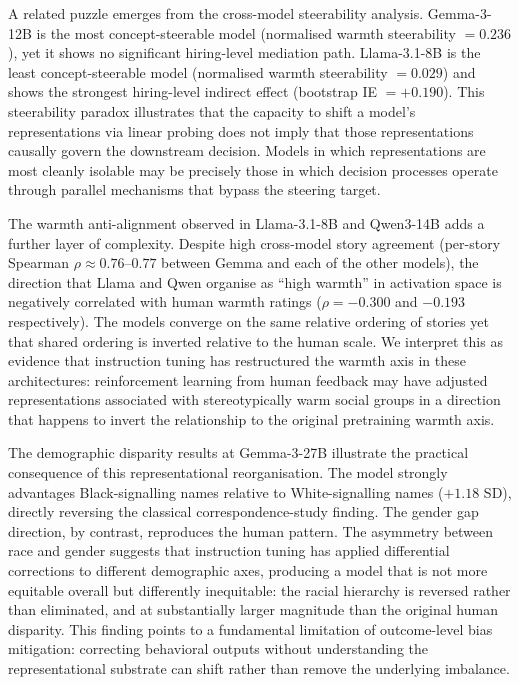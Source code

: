 \documentclass[twocolumn]{article}
\begin{document}
A related puzzle emerges from the cross-model steerability analysis.
Gemma-3-12B is the most concept-steerable model (normalised warmth
steerability $= 0.236$), yet it shows no significant hiring-level
mediation path.
Llama-3.1-8B is the least concept-steerable model (normalised warmth
steerability $= 0.029$) and shows the strongest hiring-level indirect
effect (bootstrap IE $= +0.190$).
This steerability paradox illustrates that the capacity to shift a
model's representations via linear probing does not imply that those
representations causally govern the downstream decision.
Models in which representations are most cleanly isolable may be
precisely those in which decision processes operate through parallel
mechanisms that bypass the steering target.

The warmth anti-alignment observed in Llama-3.1-8B and Qwen3-14B adds
a further layer of complexity.
Despite high cross-model story agreement (per-story Spearman $\rho
\approx 0.76$--$0.77$ between Gemma and each of the other models),
the direction that Llama and Qwen organise as ``high warmth'' in
activation space is negatively correlated with human warmth ratings
($\rho = -0.300$ and $-0.193$ respectively).
The models converge on the same relative ordering of stories yet that
shared ordering is inverted relative to the human scale.
We interpret this as evidence that instruction tuning has restructured
the warmth axis in these architectures: reinforcement learning from
human feedback may have adjusted representations associated with
stereotypically warm social groups in a direction that happens to
invert the relationship to the original pretraining warmth axis.

The demographic disparity results at Gemma-3-27B illustrate the
practical consequence of this representational reorganisation.
The model strongly advantages Black-signalling names relative to
White-signalling names ($+1.18$ SD), directly reversing the classical
correspondence-study finding.
The gender gap direction, by contrast, reproduces the human pattern.
The asymmetry between race and gender suggests that instruction tuning
has applied differential corrections to different demographic axes,
producing a model that is not more equitable overall but differently
inequitable: the racial hierarchy is reversed rather than eliminated,
and at substantially larger magnitude than the original human disparity.
This finding points to a fundamental limitation of outcome-level bias
mitigation: correcting behavioral outputs without understanding the
representational substrate can shift rather than remove the underlying
imbalance.
\end{document}
